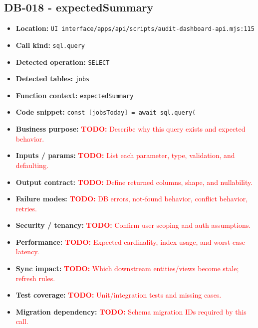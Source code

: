 \documentclass[11pt]{article}
\newcommand{\todoitem}[1]{\textcolor{red}{\textbf{TODO:} #1}}
\begin{document}
\subsection{DB-018 - expectedSummary}
\begin{itemize}[leftmargin=1.5em]
\item \textbf{Location:} \texttt{UI interface/apps/api/scripts/audit-dashboard-api.mjs:115}
\item \textbf{Call kind:} \texttt{sql.query}
\item \textbf{Detected operation:} \texttt{SELECT}
\item \textbf{Detected tables:} \texttt{jobs}
\item \textbf{Function context:} \texttt{expectedSummary}
\item \textbf{Code snippet:} \texttt{const [jobsToday] = await sql.query(}
\item \textbf{Business purpose:} \todoitem{Describe why this query exists and expected behavior.}
\item \textbf{Inputs / params:} \todoitem{List each parameter, type, validation, and defaulting.}
\item \textbf{Output contract:} \todoitem{Define returned columns, shape, and nullability.}
\item \textbf{Failure modes:} \todoitem{DB errors, not-found behavior, conflict behavior, retries.}
\item \textbf{Security / tenancy:} \todoitem{Confirm user scoping and auth assumptions.}
\item \textbf{Performance:} \todoitem{Expected cardinality, index usage, and worst-case latency.}
\item \textbf{Sync impact:} \todoitem{Which downstream entities/views become stale; refresh rules.}
\item \textbf{Test coverage:} \todoitem{Unit/integration tests and missing cases.}
\item \textbf{Migration dependency:} \todoitem{Schema migration IDs required by this call.}
\end{itemize}
\end{document}
